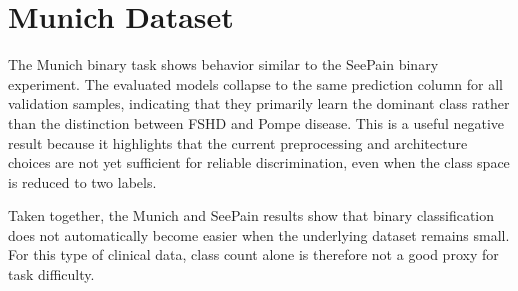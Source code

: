 \documentclass[12pt]{report}
\begin{document}
\section{Munich Dataset}

The Munich binary task shows behavior similar to the SeePain binary experiment. The evaluated models collapse to the same prediction column for all validation samples, indicating that they primarily learn the dominant class rather than the distinction between FSHD and Pompe disease. This is a useful negative result because it highlights that the current preprocessing and architecture choices are not yet sufficient for reliable discrimination, even when the class space is reduced to two labels.

Taken together, the Munich and SeePain results show that binary classification does not automatically become easier when the underlying dataset remains small. For this type of clinical data, class count alone is therefore not a good proxy for task difficulty.
\end{document}
